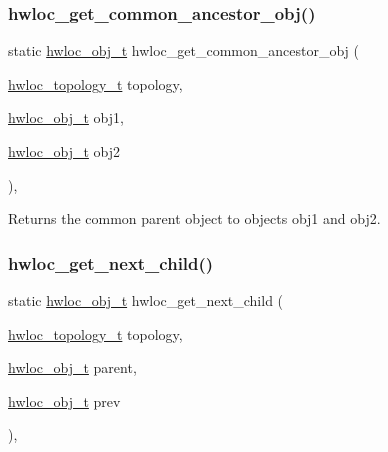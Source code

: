 \subsubsection{\texorpdfstring{hwloc\+\_\+get\+\_\+common\+\_\+ancestor\+\_\+obj()}{hwloc\_get\_common\_ancestor\_obj()}}
{\footnotesize\ttfamily static \hyperlink{a00185_ga79b8ab56877ef99ac59b833203391c7d}{hwloc\+\_\+obj\+\_\+t} hwloc\+\_\+get\+\_\+common\+\_\+ancestor\+\_\+obj (\begin{DoxyParamCaption}\item[{\hyperlink{a00186_ga9d1e76ee15a7dee158b786c30b6a6e38}{hwloc\+\_\+topology\+\_\+t}}]{topology,  }\item[{\hyperlink{a00185_ga79b8ab56877ef99ac59b833203391c7d}{hwloc\+\_\+obj\+\_\+t}}]{obj1,  }\item[{\hyperlink{a00185_ga79b8ab56877ef99ac59b833203391c7d}{hwloc\+\_\+obj\+\_\+t}}]{obj2 }\end{DoxyParamCaption})\hspace{0.3cm}{\ttfamily [inline]}, {\ttfamily [static]}}



Returns the common parent object to objects {\ttfamily obj1} and {\ttfamily obj2}. 

\mbox{\label{a00197_ga12d8565a3436c565e791ed02a0353621}} 
\subsubsection{\texorpdfstring{hwloc\+\_\+get\+\_\+next\+\_\+child()}{hwloc\_get\_next\_child()}}
{\footnotesize\ttfamily static \hyperlink{a00185_ga79b8ab56877ef99ac59b833203391c7d}{hwloc\+\_\+obj\+\_\+t} hwloc\+\_\+get\+\_\+next\+\_\+child (\begin{DoxyParamCaption}\item[{\hyperlink{a00186_ga9d1e76ee15a7dee158b786c30b6a6e38}{hwloc\+\_\+topology\+\_\+t}}]{topology,  }\item[{\hyperlink{a00185_ga79b8ab56877ef99ac59b833203391c7d}{hwloc\+\_\+obj\+\_\+t}}]{parent,  }\item[{\hyperlink{a00185_ga79b8ab56877ef99ac59b833203391c7d}{hwloc\+\_\+obj\+\_\+t}}]{prev }\end{DoxyParamCaption})\hspace{0.3cm}{\ttfamily [inline]}, {\ttfamily [static]}}



